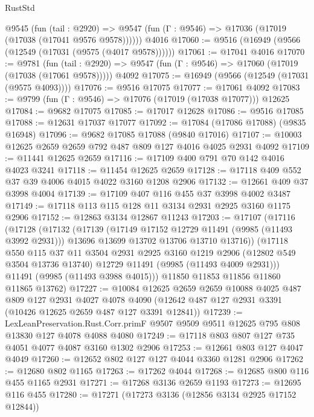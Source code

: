 \begin{lexlean}{RustStd}
\begin{coremodule}
    @9545
      (fun (tail : @2920) =>
      @9547 (fun (Γ : @9546) => @17036 (@17019 (@17038 (@17041 @9576 @9578))))))
    @4016
@17060 := @9516 (@16949 (@9566 (@12549 (@17031 (@9575 (@4017 @9578))))))
@17061 := @17041 @4016
@17070 := @9781
    (fun (tail : @2920) => @9547 (fun (Γ : @9546) => @17060 (@17019 (@17038 (@17061 @9578)))))
    @4092
@17075 := @16949 (@9566 (@12549 (@17031 (@9575 @4093))))
@17076 := @9516 @17075
@17077 := @17061 @4092
@17083 := @9799 (fun (Γ : @9546) => @17076 (@17019 (@17038 @17077))) @12625
@17084 := @9682 @17075
@17085 := @17017 @12628
@17086 := @9516 @17085
@17088 := @12631 @17037 @17077
@17092 := @17084 (@17086 @17088) (@9835 @16948)
@17096 := @9682 @17085 @17088 (@9840 @17016)
@17107 := @10003 @12625 @2659 @2659 @792 @487 @809 @127 @4016 @4025 @2931 @4092
@17109 := @11441 @12625 @2659
@17116 := @17109 @400 @791 @70 @142 @4016 @4023 @3241
@17118 := @11454 @12625 @2659
@17128 := @17118 @409 @552 @37 @39 @4006 @4015 @4022 @3160 @1208 @2906
@17132 := @12661 @409 @37 @3998 @4004
@17139 := @17109 @407 @116 @455 @37 @3998 @4002 @3487
@17149 := @17118 @113 @115 @128 @11 @3134 @2931 @2925 @3160 @1175 @2906
@17152 := @12863 @3134 @12867 @11243
@17203 := @17107
    (@17116
      (@17128
        (@17132
          (@17139
            (@17149 @17152 @12729 @11491 (@9985 (@11493 @3992 @2931)))
            @13696
            @13699
            @13702
            @13706
            @13710
            @13716))
        (@17118
          @550
          @115
          @37
          @11
          @3504
          @2931
          @2925
          @3160
          @1219
          @2906
          (@12802 @549 @3504 @13736 @13740)
          @12729
          @11491
          (@9985 (@11493 @4009 @2931)))
        @11491
        (@9985 (@11493 @3988 @4015)))
      @11850
      @11853
      @11856
      @11860
      @11865
      @13762)
@17227 := @10084
    @12625
    @2659
    @2659
    @10088
    @4025
    @487
    @809
    @127
    @2931
    @4027
    @4078
    @4090
    (@12642 @487 @127 @2931 @3391 (@10426 @12625 @2659 @487 @127 @3391 @12841))
@17239 := LexLeanPreservation.Rust.Corr.primF
    @9507
    @9509
    @9511
    @12625
    @795
    @808
    @13830
    @127
    @4078
    @4088
    @4080
@17249 := @17118 @803 @807 @127 @735 @4051 @4077 @4087 @3160 @1302 @2906
@17253 := @12661 @803 @127 @4047 @4049
@17260 := @12652 @802 @127 @127 @4044 @3360 @1281 @2906
@17262 := @12680 @802 @1165
@17263 := @17262 @4044
@17268 := @12685 @800 @116 @455 @1165 @2931
@17271 := @17268 @3136 @2659 @1193
@17273 := @12695 @116 @455
@17280 := @17271 (@17273 @3136 (@12856 @3134 @2925 @17152 @12844))

\end{coremodule}
\end{lexlean}
